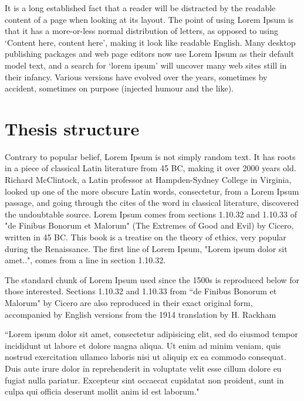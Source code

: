 It is a long established fact that a reader will be distracted by the readable content of a page when looking at its layout. The point of using Lorem Ipsum is that it has a more-or-less normal distribution of letters, as opposed to using `Content here, content here', making it look like readable English. Many desktop publishing packages and web page editors now use Lorem Ipsum as their default model text, and a search for `lorem ipsum' will uncover many web sites still in their infancy. Various versions have evolved over the years, sometimes by accident, sometimes on purpose (injected humour and the like).

\section{Thesis structure}  %
\label{section1.3}

Contrary to popular belief, Lorem Ipsum is not simply random text. It has roots in a piece of classical Latin literature from 45 BC, making it over 2000 years old. Richard McClintock, a Latin professor at Hampden-Sydney College in Virginia, looked up one of the more obscure Latin words, consectetur, from a Lorem Ipsum passage, and going through the cites of the word in classical literature, discovered the undoubtable source. Lorem Ipsum comes from sections 1.10.32 and 1.10.33 of "de Finibus Bonorum et Malorum" (The Extremes of Good and Evil) by Cicero, written in 45 BC. This book is a treatise on the theory of ethics, very popular during the Renaissance. The first line of Lorem Ipsum, "Lorem ipsum dolor sit amet..", comes from a line in section 1.10.32.

The standard chunk of Lorem Ipsum used since the 1500s is reproduced below for those interested. Sections 1.10.32 and 1.10.33 from ``de Finibus Bonorum et Malorum" by Cicero are also reproduced in their exact original form, accompanied by English versions from the 1914 translation by H. Rackham

``Lorem ipsum dolor sit amet, consectetur adipisicing elit, sed do eiusmod tempor incididunt ut labore et dolore magna aliqua. Ut enim ad minim veniam, quis nostrud exercitation ullamco laboris nisi ut aliquip ex ea commodo consequat. Duis aute irure dolor in reprehenderit in voluptate velit esse cillum dolore eu fugiat nulla pariatur. Excepteur sint occaecat cupidatat non proident, sunt in culpa qui officia deserunt mollit anim id est laborum."

